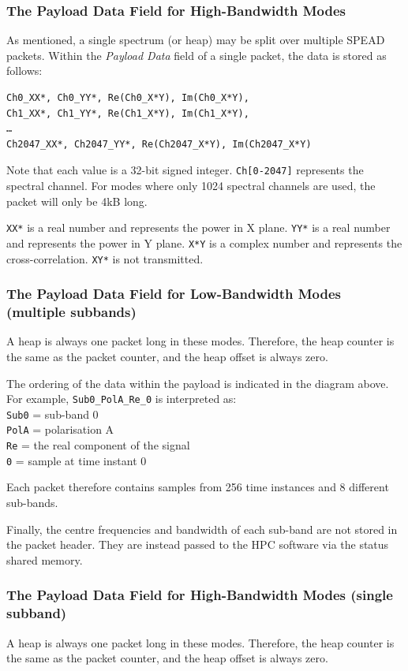 \documentclass[11pt]{article} %
\begin{document}
\subsubsection{The Payload Data Field for High-Bandwidth Modes}
As mentioned, a single spectrum (or heap) may be split over multiple SPEAD packets. Within the {\em Payload Data} field of a single packet, the data is stored as follows:
\begin{verbatim}
Ch0_XX*, Ch0_YY*, Re(Ch0_X*Y), Im(Ch0_X*Y),
Ch1_XX*, Ch1_YY*, Re(Ch1_X*Y), Im(Ch1_X*Y),
…
Ch2047_XX*, Ch2047_YY*, Re(Ch2047_X*Y), Im(Ch2047_X*Y)
\end{verbatim}

Note that each value is a 32-bit signed integer. \texttt{Ch[0-2047]} represents the spectral channel. For modes where only 1024 spectral channels are used, the packet will only be 4kB long.

\texttt{XX*} is a real number and represents the power in X plane. \texttt{YY*} is a real number and represents the power in Y plane. \texttt{X*Y} is a complex number and represents the cross-correlation. \texttt{XY*} is not transmitted.

\subsubsection{The Payload Data Field for Low-Bandwidth Modes (multiple subbands)}
A heap is always one packet long in these modes. Therefore, the heap counter is the same as the packet counter, and the heap offset is always zero.

The ordering of the data within the payload is indicated in the diagram above. For example, \texttt{Sub0\_PolA\_Re\_0} is interpreted as: \\
\texttt{Sub0} = sub-band 0 \\
\texttt{PolA} = polarisation A \\ 
\texttt{Re} = the real component of the signal \\
\texttt{0} = sample at time instant 0

Each packet therefore contains samples from 256 time instances and 8 different sub-bands.

Finally, the centre frequencies and bandwidth of each sub-band are not stored in the packet header. They are instead passed to the HPC software via the status shared memory.

\subsubsection{The Payload Data Field for High-Bandwidth Modes (single subband)}
A heap is always one packet long in these modes. Therefore, the heap counter is the same as the packet counter, and the heap offset is always zero.
\end{document}
